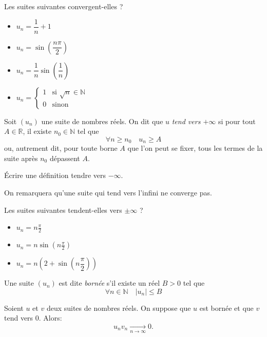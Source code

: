 \documentclass[12pt]{article}
\newcommand{\RR}{\mathbb R}
\newcommand{\NN}{\mathbb N}
\theoremstyle{definition}
\theoremstyle{theorem}
\begin{document}
\begin{exer}
Les suites suivantes convergent-elles ?
\begin{multicols}{2}
\begin{itemize}
	\item $u_n = \dfrac1n +1$
	\item $u_n = \sin\left(\dfrac{n\pi}{2}\right) $
	\item $u_n = \dfrac 1n\sin\left(\dfrac 1n\right)$
	\item $u_n = \begin{cases}
	1 & \text{si }\sqrt n\in\NN\\
	0 & \text{sinon}
	\end{cases}$
\end{itemize}
\end{multicols}
\end{exer}

\begin{defn}
Soit $(u_n)$ une suite de nombres réels. On dit que $u$ \emph{tend vers $+\infty$} si pour tout $A\in\RR$, il existe $n_0\in\NN$ tel que
\[
\forall n\geq n_0\quad u_n \geq A
\]
ou, autrement dit, pour toute borne $A$ que l'on peut se fixer, tous les termes de la suite après $n_0$ dépassent $A$.
\end{defn}

\begin{exer}
Écrire une définition tendre vers $-\infty$.
\end{exer}

On remarquera qu'une suite qui tend vers l'infini ne converge pas.

\begin{exer}
Les suites suivantes tendent-elles vers $\pm\infty$ ?
\begin{itemize}
	\item $u_n = n\frac\pi 2$
	\item $u_n = n\sin\left(n\frac\pi2\right)$
	\item $u_n = n\left(2+\sin\left(n\dfrac\pi2\right)\right)$
\end{itemize}
\end{exer}

\begin{defn}
	Une suite $(u_n)$ est dite \emph{bornée} s'il existe un réel $B > 0$ tel que
	\[
	\forall n\in\NN\quad |u_n|\leq B
	\]
\end{defn}

\begin{prop}
Soient $u$ et $v$ deux suites de nombres réels. On suppose que $u$ est bornée et que $v$ tend vers 0. Alors:
\[
u_nv_n \xrightarrow[n\to\infty]{}0.
\]
\end{prop}
\end{document}
